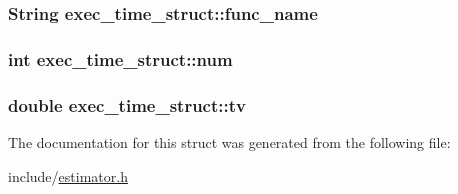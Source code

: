 \subsubsection[{\texorpdfstring{func\+\_\+name}{func_name}}]{\setlength{\rightskip}{0pt plus 5cm}String exec\+\_\+time\+\_\+struct\+::func\+\_\+name}\hypertarget{structexec__time__struct_a29e6eb640031d9511b93e6f804ce5378}{}\label{structexec__time__struct_a29e6eb640031d9511b93e6f804ce5378}
\subsubsection[{\texorpdfstring{num}{num}}]{\setlength{\rightskip}{0pt plus 5cm}int exec\+\_\+time\+\_\+struct\+::num}\hypertarget{structexec__time__struct_ae25487e7ece38060f921344945dae62d}{}\label{structexec__time__struct_ae25487e7ece38060f921344945dae62d}
\subsubsection[{\texorpdfstring{tv}{tv}}]{\setlength{\rightskip}{0pt plus 5cm}double exec\+\_\+time\+\_\+struct\+::tv}\hypertarget{structexec__time__struct_a58e8eec3a309584d7e9dfc76b1a38f62}{}\label{structexec__time__struct_a58e8eec3a309584d7e9dfc76b1a38f62}


The documentation for this struct was generated from the following file\+:\begin{DoxyCompactItemize}
\item 
include/\hyperlink{estimator_8h}{estimator.\+h}\end{DoxyCompactItemize}
